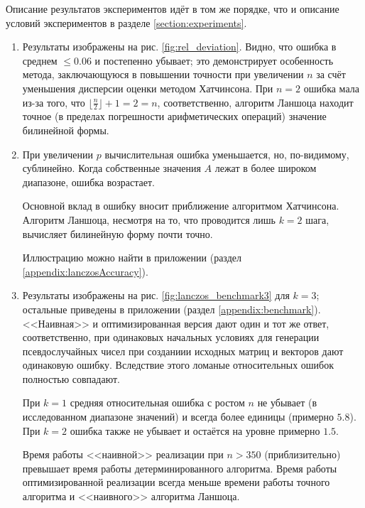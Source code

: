 Описание результатов экспериментов идёт в том же порядке, что и описание условий экспериментов в разделе \ref{section:experiments}.

\begin{enumerate}
    \item Результаты изображены на рис. \ref{fig:rel_deviation}. Видно, что ошибка в среднем $ \le 0.06 $ и постепенно убывает; это демонстрирует особенность метода, заключающуюся в повышении точности при увеличении $ n $ за счёт уменьшения дисперсии оценки методом Хатчинсона.
    При $ n = 2 $ ошибка мала из-за того, что $ \lfloor \frac{n}{2} \rfloor + 1 = 2 = n $, соответственно, алгоритм Ланшоца находит точное (в пределах погрешности арифметических операций) значение билинейной формы.

    \item При увеличении $ p $ вычислительная ошибка уменьшается, но, по-видимому, сублинейно.
    Когда собственные значения $ A $ лежат в более широком диапазоне, ошибка возрастает.

    Основной вклад в ошибку вносит приближение алгоритмом Хатчинсона.
    Алгоритм Ланшоца, несмотря на то, что проводится лишь $ k=2 $ шага, вычисляет билинейную форму почти точно. %

    Иллюстрацию можно найти в приложении (раздел \ref{appendix:lanczosAccuracy}).

    \item Результаты изображены на рис. \ref{fig:lanczos_benchmark3} для $ k=3 $; остальные приведены в приложении (раздел \ref{appendix:benchmark}).
    <<Наивная>> и оптимизированная версия дают один и тот же ответ, соответственно, при одинаковых начальных условиях для генерации псевдослучайных чисел при созданиии исходных матриц и векторов дают одинаковую ошибку.
    Вследствие этого ломаные относительных ошибок полностью совпадают.

    При $ k=1 $ средняя относительная ошибка с ростом $ n $ не убывает (в исследованном диапазоне значений) и всегда более единицы (примерно $ 5.8 $).
    При $ k = 2 $ ошибка также не убывает и остаётся на уровне примерно $ 1.5 $.

    Время работы <<наивной>> реализации при $ n > 350 $ (приблизительно) превышает время работы детерминированного алгоритма. Время работы оптимизированной реализации всегда меньше времени работы точного алгоритма и <<наивного>> алгоритма Ланшоца.

\end{enumerate}

